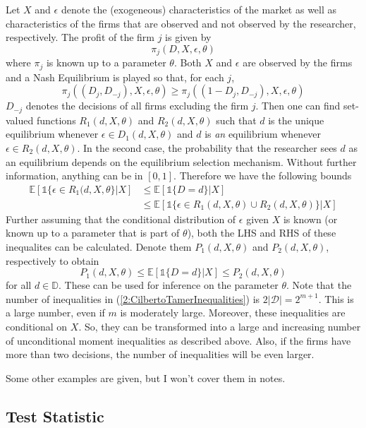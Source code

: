 Let $X$ and $\epsilon$ denote the (exogeneous) characteristics of the market as well as characteristics of the firms that are observed and not observed by the researcher, respectively. The profit of the firm $j$ is given by 
$$\pi_j(D, X, \epsilon, \theta)$$
where $\pi_j$ is known up to a parameter $\theta$. Both $X$ and $\epsilon$ are observed by the firms and a Nash Equilibrium is played so that, for each $j$,
$$\pi_j((D_j, D_{-j}),X, \epsilon, \theta) \geq \pi_j((1-D_j, D_{-j}), X, \epsilon, \theta)$$
$D_{-j}$ denotes the decisions of all firms excluding the firm $j$. Then one can find set-valued functions $R_1(d, X, \theta)$ and $R_2(d, X, \theta)$ such that $d$ is the unique equilibrium whenever $\epsilon \in D_1(d,X, \theta)$ and $d$ is \textit{an} equilibrium whenever $\epsilon \in R_2(d,X, \theta)$. In the second case, the probability that the researcher sees $d$ as an equilibrium depends on the equilibrium selection mechanism. Without further information, anything can be in $[0,1]$. Therefore we have the following bounds 
\begin{align*}
	\mathbb{E}[\mathds{1}\{\epsilon \in R_1(d,X, \theta\}|X] &\leq \mathbb{E}[{\mathds{1}\{D=d\}|X}] \\
	&\leq \mathbb{E}[\mathds{1}\{\epsilon \in R_1(d,X,\theta) \cup R_2(d,X,\theta) \} | X]
\end{align*}
Further assuming that the conditional distribution of $\epsilon$ given $X$ is known (or known up to a parameter that is part of $\theta$), both the LHS and RHS of these inequalites can be calculated. Denote them $P_1(d, X, \theta)$ and $P_2(d,X,\theta)$, respectively to obtain 
\begin{equation}
	\label{2:CilbertoTamerInequalities}
	P_1(d, X, \theta) \leq \mathbb{E}[\mathds{1}\{D=d\}|X] \leq P_2(d,X,\theta)
\end{equation}
for all $d \in \mathds{D}$. These can be used for inference on the parameter $\theta$. Note that the number of inequalities in (\ref{2:CilbertoTamerInequalities}) is $2|\mathscr{D}| = 2^{m+1}$. This is a large number, even if $m$ is moderately large. Moreover, these inequalities are conditional on $X$. So, they can be transformed into a large and increasing number of unconditional moment inequalities as described above. Also, if the firms have more than two decisions, the number of inequalities will be even larger. 

Some other examples are given, but I won't cover them in notes. 

\subsection{Test Statistic}

